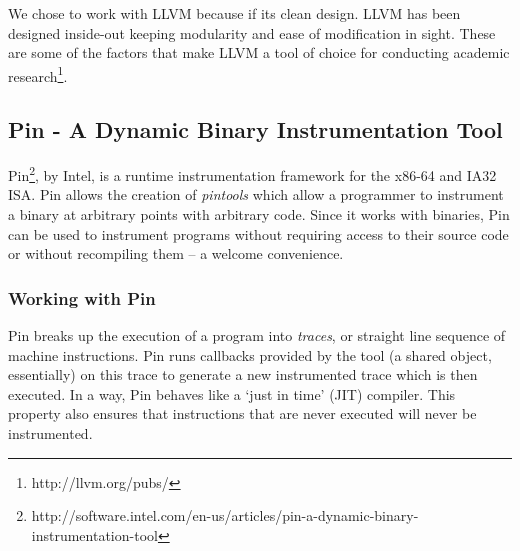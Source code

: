 We chose to work with LLVM because if its clean design.  LLVM has been
designed inside-out keeping modularity and ease of modification in
sight.  These are some of the factors that make LLVM a tool of choice
for conducting academic research\footnote{http://llvm.org/pubs/}.

\subsection{Pin - A Dynamic Binary Instrumentation Tool}

Pin\footnote{http://software.intel.com/en-us/articles/pin-a-dynamic-binary-instrumentation-tool},
by Intel, is a runtime instrumentation framework for the x86-64 and
IA32 ISA.  Pin allows the creation of \textit{pintools} which allow a
programmer to instrument a binary at arbitrary points with arbitrary
code.  Since it works with binaries, Pin can be used to instrument
programs without requiring access to their source code or without
recompiling them -- a welcome convenience.

\subsubsection{Working with Pin}

Pin breaks up the execution of a program into \textit{traces}, or
straight line sequence of machine instructions.  Pin runs callbacks
provided by the tool (a shared object, essentially) on this trace to
generate a new instrumented trace which is then executed.  In a way,
Pin behaves like a `just in time' (JIT) compiler.  This property also
ensures that instructions that are never executed will never be
instrumented.


